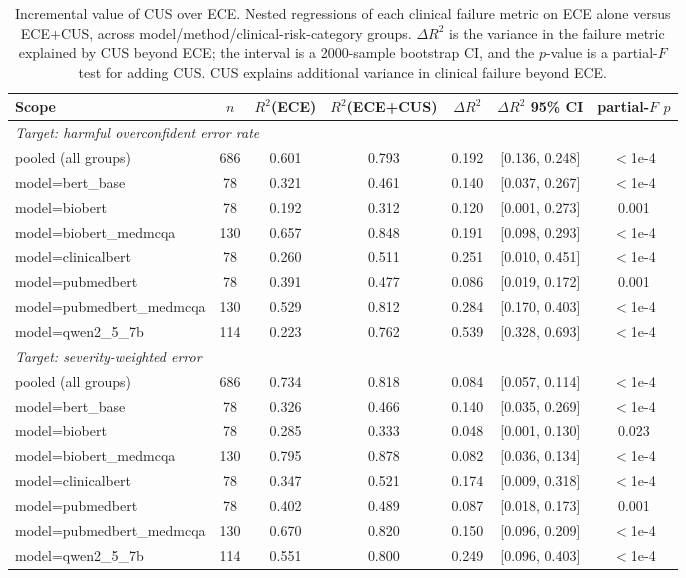 \begin{table}[h]
\centering
\caption{Incremental value of CUS over ECE. Nested regressions of each clinical failure
metric on ECE alone versus ECE$+$CUS, across model/method/clinical-risk-category groups.
$\Delta R^2$ is the variance in the failure metric explained by CUS beyond ECE; the interval
is a 2000-sample bootstrap CI, and the $p$-value is a partial-$F$ test for adding CUS. CUS
explains additional variance in clinical failure beyond ECE.}
\label{tab:cus_incremental}
\renewcommand{\arraystretch}{1.15}
\small
\begin{tabular}{lcccccc}
\hline
\textbf{Scope} & \textbf{$n$} & \textbf{$R^2$(ECE)} & \textbf{$R^2$(ECE+CUS)} & \textbf{$\Delta R^2$} & \textbf{$\Delta R^2$ 95\% CI} & \textbf{partial-$F$ $p$} \\
\hline
\multicolumn{7}{l}{\textit{Target: harmful overconfident error rate}} \\
pooled (all groups) & 686 & 0.601 & 0.793 & 0.192 & [0.136, 0.248] & $<$1e-4 \\
model=bert\_base & 78 & 0.321 & 0.461 & 0.140 & [0.037, 0.267] & $<$1e-4 \\
model=biobert & 78 & 0.192 & 0.312 & 0.120 & [0.001, 0.273] & 0.001 \\
model=biobert\_medmcqa & 130 & 0.657 & 0.848 & 0.191 & [0.098, 0.293] & $<$1e-4 \\
model=clinicalbert & 78 & 0.260 & 0.511 & 0.251 & [0.010, 0.451] & $<$1e-4 \\
model=pubmedbert & 78 & 0.391 & 0.477 & 0.086 & [0.019, 0.172] & 0.001 \\
model=pubmedbert\_medmcqa & 130 & 0.529 & 0.812 & 0.284 & [0.170, 0.403] & $<$1e-4 \\
model=qwen2\_5\_7b & 114 & 0.223 & 0.762 & 0.539 & [0.328, 0.693] & $<$1e-4 \\
\hline
\multicolumn{7}{l}{\textit{Target: severity-weighted error}} \\
pooled (all groups) & 686 & 0.734 & 0.818 & 0.084 & [0.057, 0.114] & $<$1e-4 \\
model=bert\_base & 78 & 0.326 & 0.466 & 0.140 & [0.035, 0.269] & $<$1e-4 \\
model=biobert & 78 & 0.285 & 0.333 & 0.048 & [0.001, 0.130] & 0.023 \\
model=biobert\_medmcqa & 130 & 0.795 & 0.878 & 0.082 & [0.036, 0.134] & $<$1e-4 \\
model=clinicalbert & 78 & 0.347 & 0.521 & 0.174 & [0.009, 0.318] & $<$1e-4 \\
model=pubmedbert & 78 & 0.402 & 0.489 & 0.087 & [0.018, 0.173] & 0.001 \\
model=pubmedbert\_medmcqa & 130 & 0.670 & 0.820 & 0.150 & [0.096, 0.209] & $<$1e-4 \\
model=qwen2\_5\_7b & 114 & 0.551 & 0.800 & 0.249 & [0.096, 0.403] & $<$1e-4 \\
\hline
\end{tabular}
\end{table}
